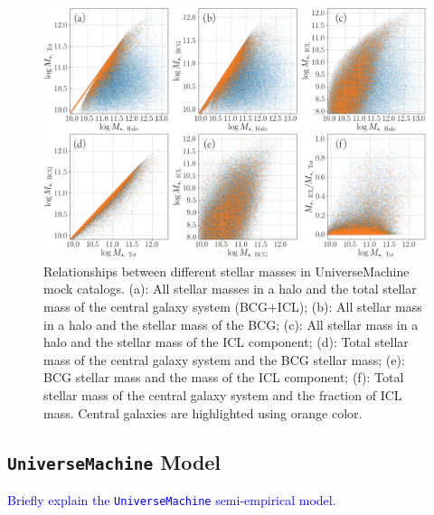 \documentclass[a4paper,fleqn,usenatbib]{mnras}
\def\um{\texttt{UniverseMachine}}
\newcommand{\plan}[1]{\textcolor{blue}{#1}}
\begin{document}
    \begin{figure}
        \centering 
        \includegraphics[width=\textwidth]{fig/um2_stellar}
            \caption{
                Relationships between different stellar masses in 
                UniverseMachine mock catalogs.  
                (a): All stellar masses in a halo and the total stellar mass of the 
                central galaxy system (BCG$+$ICL); 
                (b): All stellar mass in a halo and the stellar mass of the BCG; 
                (c): All stellar mass in a halo and the stellar mass of the ICL 
                component; 
                (d): Total stellar mass of the central galaxy system and the BCG 
                stellar mass; 
                (e): BCG stellar mass and the mass of the ICL component; 
                (f): Total stellar mass of the central galaxy system and the 
                fraction of ICL mass.  
                Central galaxies are highlighted using orange color.
                }
        \label{fig:um2_stellar}
    \end{figure}


\subsection{\um{} Model}
    \label{ssec:um}
    
    \plan{Briefly explain the \um{} semi-empirical model.}
\end{document}
